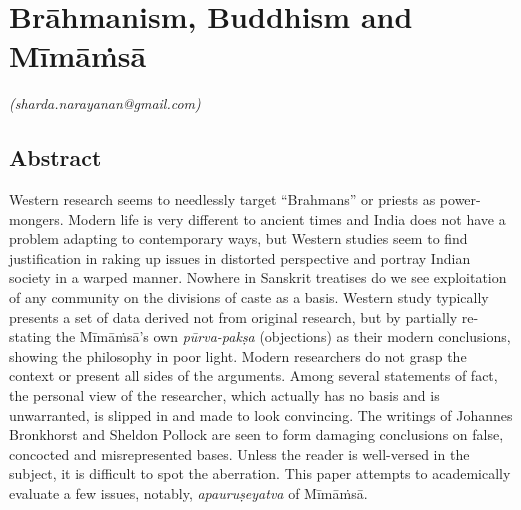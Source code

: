 
\chapter{Brāhmanism, Buddhism and Mīmāṁsā}\label{chapter6}



\begin{flushright}
\textit{(sharda.narayanan@gmail.com)}
\end{flushright}


\vspace{.2cm}

\section*{Abstract}

Western research seems to needlessly target “Brahmans” or priests as power-mongers. Modern life is very different to ancient times and India does not have a problem adapting to contemporary ways, but Western studies seem to find justification in raking up issues in distorted perspective and portray Indian society in a warped manner. Nowhere in Sanskrit treatises do we see exploitation of any community on the divisions of caste as a basis. Western study typically presents a set of data derived not from original research, but by partially re-stating the Mīmāṁsā’s own \textit{pūrva-pakṣa} (objections) as their modern conclusions, showing the philosophy in poor light. Modern researchers do not grasp the context or present all sides of the arguments. Among several statements of fact, the personal view of the researcher, which actually has no basis and is unwarranted, is slipped in and made to look convincing. The writings of Johannes Bronkhorst and Sheldon Pollock are seen to form damaging conclusions on false, concocted and misrepresented bases. Unless the reader is well-versed in the subject, it is difficult to spot the aberration. This paper attempts to academically evaluate a few issues, notably, \textit{apauruṣeyatva} of Mīmāṁsā.

\vspace{-.3cm}


